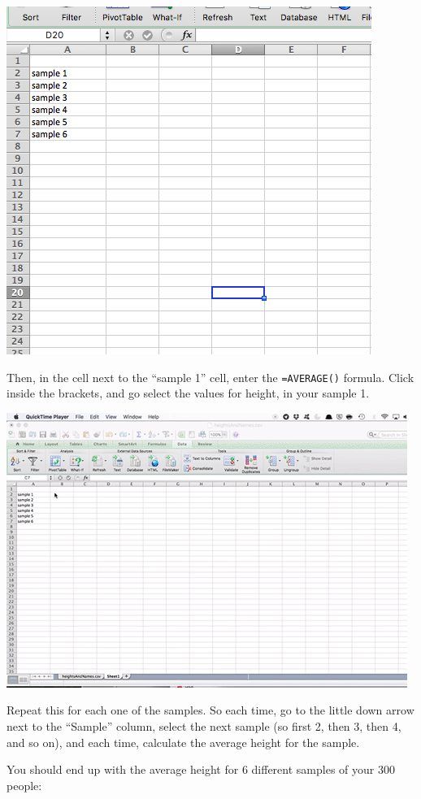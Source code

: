\documentclass[]{book}
\theoremstyle{definition}
\theoremstyle{definition}
\theoremstyle{definition}
\theoremstyle{remark}
\begin{document}
\includegraphics{imgs/set_for_avgs.png}

Then, in the cell next to the ``sample 1'' cell, enter the
\texttt{=AVERAGE()} formula. Click inside the brackets, and go select
the values for height, in your sample 1.

\includegraphics{imgs/avg_sample_1.gif}

Repeat this for each one of the samples. So each time, go to the little
down arrow next to the ``Sample'' column, select the next sample (so
first 2, then 3, then 4, and so on), and each time, calculate the
average height for the sample.

You should end up with the average height for 6 different samples of
your 300 people:
\end{document}
